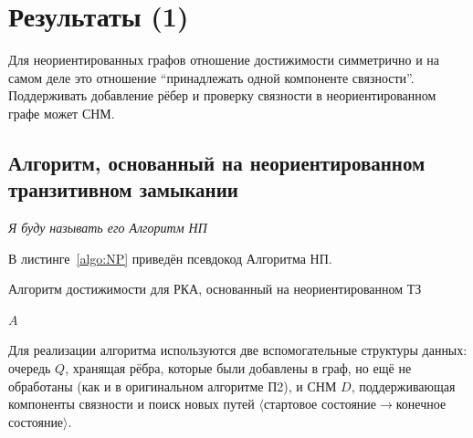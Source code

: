 \section{Результаты (1)}\label{section:bidirected}

Для неориентированных графов отношение достижимости симметрично и на самом деле это отношение ``принадлежать одной компоненте связности''. Поддерживать добавление рёбер и проверку связности в неориентированном графе может СНМ. 

\subsection{Алгоритм, основанный на неориентированном транзитивном замыкании}

\textit{Я буду называть его Алгоритм НП}

В листинге~\ref{algo:NP} приведён псевдокод Алгоритма НП.

\begin{algorithm}[H]
    \begin{algorithmic}[1]
    \caption{Алгоритм достижимости для РКА, основанный на неориентированном ТЗ}
    \label{algo:NP}
            \EndFor
        \EndFor
            \EndIf
        \EndWhile
    \State \Return $A$
    \EndFunction
    \end{algorithmic}
\end{algorithm}

Для реализации алгоритма используются две вспомогательные структуры данных: очередь $Q$, хранящая рёбра, которые были добавлены в граф, но ещё не обработаны (как и в оригинальном алгоритме П2), и СНМ $D$, поддерживающая компоненты связности и поиск новых путей $\langle$стартовое состояние$\to$конечное состояние$\rangle$. 

